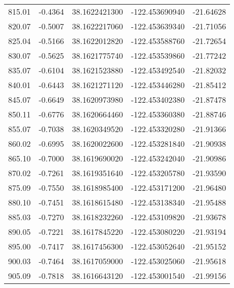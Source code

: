 \begin{scriptsize}
\begin{longtable}{p{2.5cm}p{2.5cm}p{3cm}p{3cm}p{2.5cm}}
           815.01  & 	-0.4364 &               38.1622421300  &   -122.453690940   &	-21.64628 \\
           820.07  & 	-0.5007 &               38.1622217060  &   -122.453639340   &	-21.71056 \\
           825.04  & 	-0.5166 &               38.1622012820  &   -122.453588760   &	-21.72654 \\
           830.07  & 	-0.5625 &               38.1621775740  &   -122.453539860   &	-21.77242 \\
           835.07  & 	-0.6104 &               38.1621523880  &   -122.453492540   &	-21.82032 \\
           840.01  & 	-0.6443 &               38.1621271120  &   -122.453446280   &	-21.85412 \\
           845.07  & 	-0.6649 &               38.1620973980  &   -122.453402380   &	-21.87478 \\
           850.11  & 	-0.6776 &               38.1620664460  &   -122.453360380   &	-21.88746 \\
           855.07  & 	-0.7038 &               38.1620349520  &   -122.453320280   &	-21.91366 \\
           860.02  & 	-0.6995 &               38.1620022600  &   -122.453281840   &	-21.90938 \\
           865.10  & 	-0.7000 &               38.1619690020  &   -122.453242040   &	-21.90986 \\
           870.02  & 	-0.7261 &               38.1619351640  &   -122.453205780   &	-21.93590 \\
           875.09  & 	-0.7550 &               38.1618985400  &   -122.453171200   &	-21.96480 \\
           880.10  & 	-0.7451 &               38.1618615480  &   -122.453138340   &	-21.95488 \\
           885.03  & 	-0.7270 &               38.1618232260  &   -122.453109820   &	-21.93678 \\
           890.05  & 	-0.7221 &               38.1617845220  &   -122.453080220   &	-21.93194 \\
           895.00  & 	-0.7417 &               38.1617456300  &   -122.453052640   &	-21.95152 \\
           900.03  & 	-0.7464 &               38.1617059000  &   -122.453025060   &	-21.95618 \\
           905.09  & 	-0.7818 &               38.1616643120  &   -122.453001540   &	-21.99156 \\

\end{longtable}
\end{scriptsize}
